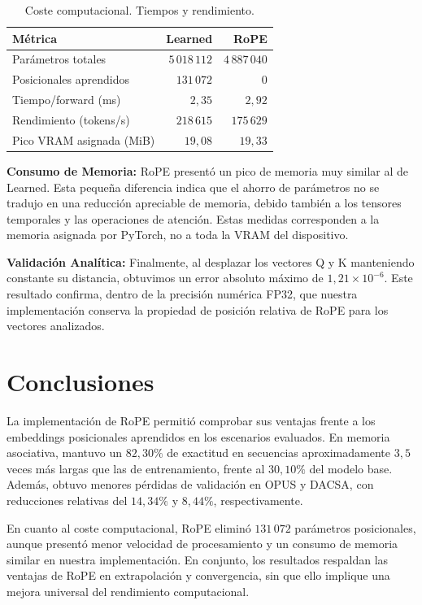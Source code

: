 \documentclass[11pt]{article}
\begin{document}
\begin{table}[!htb]
  \centering
  \small
  \setlength{\tabcolsep}{3pt}
  \begin{tabularx}{\linewidth}{@{}Xrr@{}}
    \toprule
    Métrica & Learned & RoPE \\
    \midrule
    Parámetros totales & $5\,018\,112$ & $4\,887\,040$ \\
    Posicionales aprendidos & $131\,072$ & $0$ \\
    Tiempo/forward (ms) & $2{,}35$ & $2{,}92$ \\
    Rendimiento (tokens/s) & $218\,615$ & $175\,629$ \\
    Pico VRAM asignada (MiB) & $19{,}08$ & $19{,}33$ \\
    \bottomrule
  \end{tabularx}
  \caption{Coste computacional. Tiempos y rendimiento.}
  \label{tab:coste_exp3}
\end{table}

\textbf{Consumo de Memoria:} RoPE presentó un pico de memoria 
muy similar al de Learned. 
Esta pequeña diferencia indica que el ahorro de
parámetros no se tradujo en una reducción apreciable
de memoria, debido también a los tensores temporales
y las operaciones de atención. Estas medidas corresponden
a la memoria asignada por PyTorch, no a toda la VRAM
del dispositivo.

\textbf{Validación Analítica:} Finalmente, al desplazar
los vectores Q y K manteniendo constante su distancia,
obtuvimos un error absoluto máximo de
$1{,}21\times10^{-6}$. Este resultado confirma,
dentro de la precisión numérica FP32, que nuestra
implementación conserva la propiedad de posición
relativa de RoPE para los vectores analizados.


\section{Conclusiones}
La implementación de RoPE permitió comprobar sus ventajas frente a los embeddings posicionales aprendidos en los escenarios evaluados. En memoria asociativa, mantuvo un $82{,}30\%$ de exactitud en secuencias aproximadamente $3{,}5$ veces más largas que las de entrenamiento, frente al $30{,}10\%$ del modelo base. Además, obtuvo menores pérdidas de validación en OPUS y DACSA, con reducciones relativas del $14{,}34\%$ y $8{,}44\%$, respectivamente.

En cuanto al coste computacional, RoPE eliminó $131\,072$ parámetros posicionales, aunque presentó menor velocidad de procesamiento y un consumo de memoria similar en nuestra implementación. En conjunto, los resultados respaldan las ventajas de RoPE en extrapolación y convergencia, sin que ello implique una mejora universal del rendimiento computacional.


\end{document}
